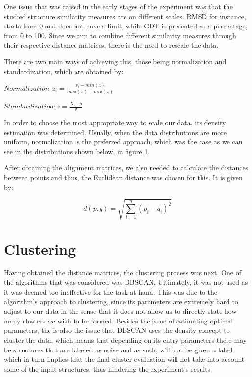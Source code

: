 One issue that was raised in the early stages of the experiment was that the studied structure similarity measures are on different scales. RMSD for instance, starts from 0 and does not have a limit, while GDT is presented as a percentage, from 0 to 100. Since we aim to combine different similarity measures through their respective distance matrices, there is the need to rescale the data.

There are two main ways of achieving this, those being normalization and standardization, which are obtained by:

	 $Normalization: z_i = \frac{x_i - min(x)}{max(x)-min(x)}$

	 $Standardization: z = \frac{X - \mu}{\sigma}$

In order to choose the most appropriate way to scale our data, its density estimation was determined. Usually, when the data distributions are more uniform, normalization is the preferred approach, which was the case as we can see in the distributions shown below, in figure \ref{fig:kde}.

\begin{figure}[htbp]
	\centering
	\caption{}
	\label{fig:kde}
\end{figure}

After obtaining the alignment matrices, we also needed to calculate the distances between points and thus, the Euclidean distance was chosen for this. It is given by:

	$$d(p,q) = \sqrt{\sum_{i = 1}^{n}\left( p_i - q_i \right)^2}$$


\section{Clustering}
Having obtained the distance matrices, the clustering process was next. One of the algorithms that was considered was DBSCAN. Ultimately, it was not used as it was deemed too ineffective for the task at hand. This was due to the algorithm's approach to clustering, since its parameters are extremely hard to adjust to our data in the sense that it does not allow us to directly state how many clusters we wish to be formed. Besides the issue of estimating optimal parameters, the is also the issue that DBSCAN uses the density concept to cluster the data, which means that depending on its entry parameters there may be structures that are labeled as noise and as such, will not be given a label which in turn implies that the final cluster evaluation will not take into account some of the input structures, thus hindering the experiment's results

